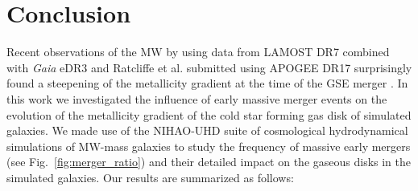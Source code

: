 \documentclass[useAMS,usenatbib]{mnras}
\begin{document}
\section{Conclusion}
\label{sec:conclusion}

Recent observations of the MW by \citet{Lu2022b} using data from LAMOST DR7 combined with {\it Gaia} eDR3 and Ratcliffe et al. submitted using APOGEE DR17 surprisingly found a steepening of the metallicity gradient at the time of the GSE merger \citep{Belokurov2018, Helmi2018}. In this work we investigated the influence of early massive merger events on the evolution of the metallicity gradient of the cold star forming gas disk of simulated galaxies. We made use of the NIHAO-UHD suite \citep{Buck2020} of cosmological hydrodynamical simulations of MW-mass galaxies to study the frequency of massive early mergers (see Fig.~\ref{fig:merger_ratio}) and their detailed impact on the gaseous disks in the simulated galaxies. Our results are summarized as follows:
\end{document}
